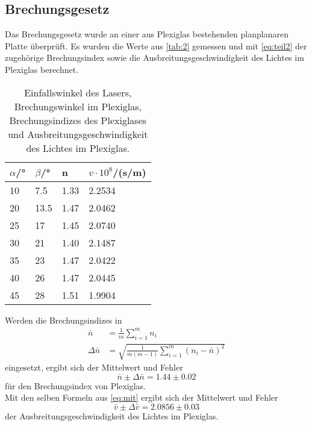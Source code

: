 \subsection{Brechungsgesetz}
Das Brechungsgesetz wurde an einer aus Plexiglas bestehenden planplanaren Platte überprüft. Es wurden die Werte aus \autoref{tab:2} gemessen und mit 
\autoref{eq:teil2} der zugehörige Brechungsindex sowie die Ausbreitungsgeschwindigkeit des Lichtes im Plexiglas berechnet.
\begin{table}[H]
  \centering
  \caption{Einfallswinkel des Lasers, Brechungswinkel im Plexiglas, Brechungsindizes des Plexiglases und Ausbreitungsgeschwindigkeit des Lichtes im Plexiglas.}
  \begin{tabular}{l|l|l|l}
  $\alpha$/° & $\beta$/° & n & $v\cdot 10^8$/(s/m)\\\hline
  10 & 7.5 & 1.33 & 2.2534\\
  20 & 13.5 & 1.47 & 2.0462\\
  25 & 17 & 1.45 & 2.0740\\
  30 & 21 & 1.40 & 2.1487\\
  35 & 23 & 1.47 & 2.0422\\
  40 & 26 & 1.47 & 2.0445\\
  45 & 28 & 1.51 & 1.9904\\\hline
  \end{tabular}
  \label{tab:2}
\end{table}
Werden die Brechungsindizes in 
\begin{align}
  \bar n&=\frac{1}{m}\sum\limits_{i=1}^m n_i \nonumber\\
  \Delta \bar n&=\sqrt{\frac{1}{m(m-1)}\sum\limits_{i=1}^m (n_i-\bar n)^2}
  \label{eq:mit}
\end{align}
eingesetzt, ergibt sich der Mittelwert und Fehler
\begin{equation*}
  \bar n \pm \Delta \bar n=1.44 \pm 0.02
\end{equation*}
für den Brechungsindex von Plexiglas.\\
Mit den selben Formeln aus \autoref{eq:mit} ergibt sich der Mittelwert und Fehler
\begin{equation*}
  \bar v \pm \Delta \bar v=2.0856 \pm 0.03
\end{equation*}
der Ausbreitungsgeschwindigkeit des Lichtes im Plexiglas.

